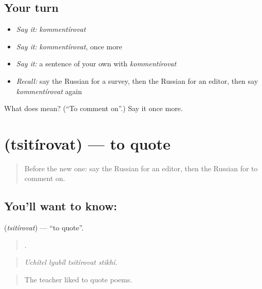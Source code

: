 \subsection*{Your turn}
\begin{itemize}
\raggedright
  \item \emph{Say it:} \emph{kommentírovat}
  \item \emph{Say it:} \emph{kommentírovat}, once more
  \item \emph{Say it:} a sentence of your own with \emph{kommentírovat}
  \item \emph{Recall:} say the Russian for a survey, then the Russian for an editor, then say \emph{kommentírovat} again
\end{itemize}

\begin{tcolorbox}[breakable,colback=teal!4,colframe=teal!35!black,title={Before you move on}]
What does  mean? (\textquotedblleft{}To comment on\textquotedblright{}.) Say it once more.
\end{tcolorbox}
\section[\texorpdfstring{\ru{цитировать} (tsitírovat)}{цитировать (tsitírovat)}]{ (tsitírovat) — to quote}

\label{lesson:RU-C284-tsitirovat}



\begin{quote}
Before the new one: say the Russian for an editor, then the Russian for to comment on.
\end{quote}

\subsection*{You'll want to know: }
\textbf{} (\emph{tsitírovat}) — \textquotedblleft{}to quote\textquotedblright{}.

\begin{quote}
   .
\end{quote}

\begin{quote}
\emph{Uchítel lyubíl tsitírovat stikhí.}
\end{quote}

\begin{quote}
The teacher liked to quote poems.
\end{quote}

